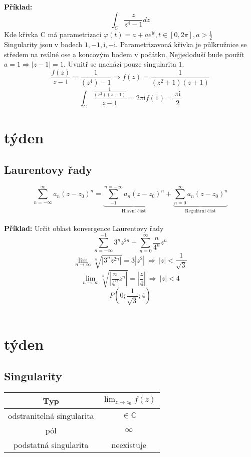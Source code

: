\documentclass{article}
\newcommand{\mi}{\mathrm{i}}
\begin{document}
        {\bf Příklad:}
        \[\int_C\frac{z}{z^4-1}dz\]
        Kde křivka C má parametrizaci $\varphi(t)=a+ae^{\mi t}, t\in[0,2\pi], a>\frac{1}{2}$
        \\
        Singularity jsou v bodech $1,-1,\mi,-\mi$.
        Parametrizavoná křivka je půlkružnice se středem na reálné ose a koncovým
        bodem v počátku. Nejjedoduší bude použít $a=1\Rightarrow |z-1|=1$.
        Uvnitř se nachází pouze singularita $1$.
        \[\frac{f(z)}{z-1}=\frac{1}{(z^4)-1}\Rightarrow f(z)=\frac{1}{(z^2+1)(z+1)}\]
        \[\int_C\frac{\frac{1}{(z^2)(z+1)}}{z-1}=2\pi\mi f(1)=\frac{\pi\mi}{2}\]
    \section{týden}%
        \subsection{Laurentovy řady}
        \[\sum_{n=-\infty}^{\infty}a_n(z-z_0)^n=
        \underbrace{\sum_{-1}^{n=-\infty}a_n(z-z_0)^n}_{\mbox{Hlavní část}}+
        \underbrace{\sum_{n=0}^{\infty}a_n(z-z_0)^n}_{\mbox{Regulární část}}\]
        \\
        {\bf Příklad:}
        Určit oblast konvergence Laurentovy řady
        \[\sum_{n=-\infty}^{-1}3^nz^{2n}+\sum_{n=0}^{\infty}\frac{n}{4^n}z^n\]
        \[\lim_{n\to\infty}\sqrt[n]{\left|3^nz^{2n}\right|}=3|z^2|\:\Rightarrow\:
        |z|<\frac{1}{\sqrt{3}}\]
        \[\lim_{n\to\infty}\sqrt[n]{\left|\frac{n}{4^n}z^n\right|}=
        \left|\frac{z}{4}\right|\:\Rightarrow\:|z|<4\]
        \[P\left(0;\frac{1}{\sqrt{3}};4\right)\]
        \\
        

    \section{týden}%
        \subsection{Singularity}
            \begin{center}            
                \begin{tabular}{|cc|}
                    \hline
                    Typ&$\lim_{z\to z_0}f(z)$\\
                    \hline
                    odstranitelná singularita& $\in \mathbb{C}$\\
                    pól&$\infty$\\
                    podstatná singularita &neexistuje\\
                    \hline
                \end{tabular}
            \end{center}
\end{document}
